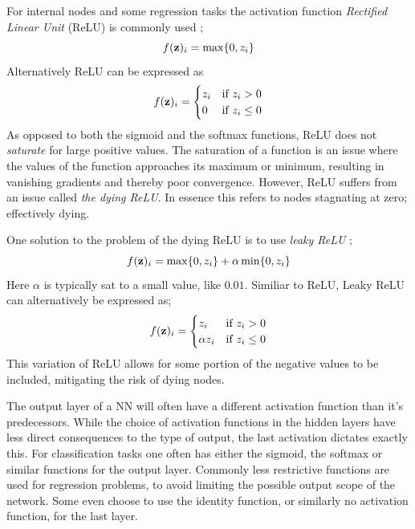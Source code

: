 For internal nodes and some regression tasks the activation function \textit{Rectified Linear Unit} (ReLU) is commonly used \citep[Building a feed forward neural network]{morten}; 
\begin{equation}\label{relu}
    f(\bold{z})_i=\max\{0, z_i\}
\end{equation}
Alternatively ReLU can be expressed as
\begin{equation}
    f(\bold{z})_i = \begin{cases} 
      z_i & \text{if } z_i > 0 \\
      0 & \text{if } z_i \leq 0 
   \end{cases}    
\end{equation}
As opposed to both the sigmoid and the softmax functions, ReLU does not \textit{saturate} for large positive values. The saturation of a function is an issue where the values of the function approaches its maximum or minimum, resulting in vanishing gradients and thereby poor convergence. However, ReLU suffers from an issue called \textit{the dying ReLU}. In essence this refers to nodes stagnating at zero; effectively dying. 

One solution to the problem of the dying ReLU is to use \textit{leaky ReLU} \citep[p. 190]{Goodfellow-et-al-2016}; 
\begin{equation}
    f(\bold{z})_i=\max\{0, z_i\}+\alpha\min\{0,z_i\}
\end{equation}
Here $\alpha$ is typically sat to a small value, like $0.01$. 
Similiar to ReLU, Leaky ReLU can alternatively be expressed as; 
\begin{equation}
    f(\bold{z})_i = \begin{cases} 
      z_i & \text{if } z_i > 0 \\
      \alpha z_i & \text{if } z_i \leq 0 
   \end{cases}
\end{equation}
This variation of ReLU allows for some portion of the negative values to be included, mitigating the risk of dying nodes. 

The output layer of a NN will often have a different activation function than it's predecessors. While the choice of activation functions in the hidden layers have less direct consequences to the type of output, the last activation dictates exactly this. For classification tasks one often has either the sigmoid, the softmax or similar functions for the output layer. Commonly less restrictive functions are used for regression problems, to avoid limiting the possible output scope of the network. Some even choose to use the identity function, or similarly no activation function, for the last layer. 

